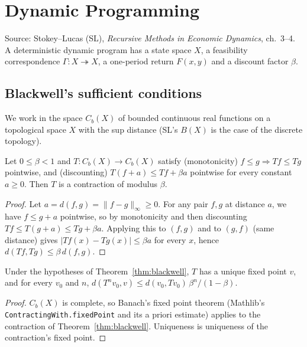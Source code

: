 \chapter{Dynamic Programming}
\label{chap:dp}

Source: Stokey--Lucas (SL), \emph{Recursive Methods in Economic Dynamics}, ch.~3--4.
A deterministic dynamic program has a state space $X$, a feasibility correspondence
$\Gamma : X \twoheadrightarrow X$, a one-period return $F(x, y)$ and a discount factor $\beta$.

\section{Blackwell's sufficient conditions}
\label{sec:blackwell}

We work in the space $C_b(X)$ of bounded continuous real functions on a topological space $X$
with the sup distance (SL's $B(X)$ is the case of the discrete topology).

\begin{theorem}
\label{thm:blackwell}
\leanok
Let $0 \le \beta < 1$ and $T : C_b(X) \to C_b(X)$ satisfy
(monotonicity) $f \le g \Rightarrow Tf \le Tg$ pointwise, and
(discounting) $T(f + a) \le Tf + \beta a$ pointwise for every constant $a \ge 0$.
Then $T$ is a contraction of modulus $\beta$.
\end{theorem}
\begin{proof}
\leanok
Let $a = d(f, g) = \|f - g\|_\infty \ge 0$. For any pair $f, g$ at distance $a$, we have
$f \le g + a$ pointwise, so by monotonicity and then discounting
$Tf \le T(g + a) \le Tg + \beta a$. Applying this to $(f, g)$ and to $(g, f)$ (same distance) gives
$|Tf(x) - Tg(x)| \le \beta a$ for every $x$, hence $d(Tf, Tg) \le \beta\, d(f, g)$.
\end{proof}

\begin{corollary}
\label{cor:blackwell_fixedPoint}
\leanok
{}
Under the hypotheses of Theorem~\ref{thm:blackwell}, $T$ has a unique fixed point $v$, and for every
$v_0$ and $n$, $d(T^n v_0, v) \le d(v_0, T v_0)\, \beta^n / (1 - \beta)$.
\end{corollary}
\begin{proof}
\leanok
$C_b(X)$ is complete, so Banach's fixed point theorem (Mathlib's \texttt{ContractingWith.fixedPoint}
and its a priori estimate) applies to the contraction of Theorem~\ref{thm:blackwell}. Uniqueness is
uniqueness of the contraction's fixed point.
\end{proof}

